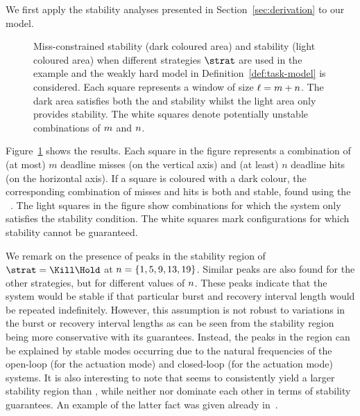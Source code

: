 We first apply the stability analyses presented in Section~\ref{sec:derivation} to our model.
\begin{figure}[t]
    \centerline{\resizebox{0.95\textwidth}{!}{}}
    \caption{Miss-constrained stability (dark coloured area) and \nilsstability{} stability (light coloured area) when different strategies $\strat$ are used in the example and the weakly hard model in Definition~\ref{def:task-model} is considered.
        Each square represents a window of size $\ell = m+n$.
        The dark area satisfies both the \switchingstability{} and \nilsstability{} stability whilst the light area only provides \nilsstability{} stability.
        The white squares denote potentially unstable combinations of $m$ and $n$.}
    \label{fig:stability_extended}
\end{figure}
Figure~\ref{fig:stability_extended} shows the results. Each square in the figure represents a combination of (at most) $m$ deadline misses (on the vertical axis) and (at least) $n$ deadline hits (on the horizontal axis).
If a square is coloured with a dark colour, the corresponding combination of misses and hits is both \nilsstability{} and \switchingstability{} stable, found using the ~\cite{Jungers:2014}. 
The light squares in the figure show combinations for which the system only satisfies the \nilsstability{} stability condition. 
The white squares mark configurations for which stability cannot be guaranteed.

We remark on the presence of peaks in the \nilsstability{} stability region of $\strat = \Kill\Hold$ at $n = \{1, 5, 9, 13, 19\}$.
Similar peaks are also found for the other strategies, but for different values of $n$.
These peaks indicate that the system would be stable if that particular burst and recovery interval length would be repeated indefinitely.
However, this assumption is not robust to variations in the burst or recovery interval lengths as can be seen from the \switchingstability{} stability region being more conservative with its guarantees.
Instead, the peaks in the \nilsstability{} region can be explained by stable modes occurring due to the natural frequencies of the open-loop (for the \tZ{} actuation mode) and closed-loop (for the \tH{} actuation mode) systems.
It is also interesting to note that \tK{} seems to consistently yield a larger stability region than \tS{}, while neither \tZ{} nor \tH{} dominate each other in terms of stability guarantees. An example of the latter fact was given already in~\cite{schenato09}.

